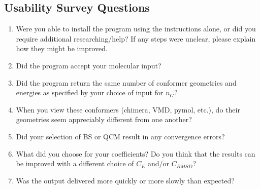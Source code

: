 \documentclass[12pt, titlepage]{article}
\begin{document}
\subsection{Usability Survey Questions} \label{survey}


\begin{enumerate}
	\item Were you able to install the program using the instructions alone, or 
	did you require additional researching/help? If any steps were unclear, 
	please explain how they might be improved.
	\item Did the program accept your molecular input?
	\item Did the program return the same number of conformer geometries and 
	energies as specified by your choice of input for $n_G$?
	\item When you view these conformers (chimera, VMD, pymol, etc.), do their 
	geometries seem appreciably different from one another?
	\item Did your selection of BS or QCM  result in any convergence errors?
	\item What did you choose for your coefficients? Do you think that the 
	results can be improved with a different choice of $C_E$ and/or $C_{RMSD}$?
	\item Was the output delivered more quickly or more slowly than expected?
	
\end{enumerate}
\end{document}
